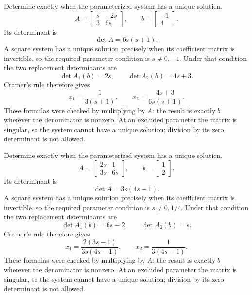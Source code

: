 \goal Determine exactly when the parameterized system has a unique solution.
\[A=\begin{bmatrix}s&- 2 s\\3&6 s\end{bmatrix},\qquad b=\begin{bmatrix}-1\\4\end{bmatrix}.\]
Its determinant is
\[\det A=6 s \left(s + 1\right).\]
A square system has a unique solution precisely when its coefficient matrix is invertible, so the required parameter condition is $s\ne0,-1$. Under that condition the two replacement determinants are
\[\det A_1(b)=2 s,\qquad\det A_2(b)=4 s + 3.\]
Cramer's rule therefore gives
\[x_1=\frac{1}{3 \left(s + 1\right)},\qquad x_2=\frac{4 s + 3}{6 s \left(s + 1\right)}.\]
These formulas were checked by multiplying by $A$: the result is exactly $b$ wherever the denominator is nonzero. At an excluded parameter the matrix is singular, so the system cannot have a unique solution; division by its zero determinant is not allowed.

\goal Determine exactly when the parameterized system has a unique solution.
\[A=\begin{bmatrix}2 s&1\\3 s&6 s\end{bmatrix},\qquad b=\begin{bmatrix}1\\2\end{bmatrix}.\]
Its determinant is
\[\det A=3 s \left(4 s - 1\right).\]
A square system has a unique solution precisely when its coefficient matrix is invertible, so the required parameter condition is $s\ne0,1/4$. Under that condition the two replacement determinants are
\[\det A_1(b)=6 s - 2,\qquad\det A_2(b)=s.\]
Cramer's rule therefore gives
\[x_1=\frac{2 \left(3 s - 1\right)}{3 s \left(4 s - 1\right)},\qquad x_2=\frac{1}{3 \left(4 s - 1\right)}.\]
These formulas were checked by multiplying by $A$: the result is exactly $b$ wherever the denominator is nonzero. At an excluded parameter the matrix is singular, so the system cannot have a unique solution; division by its zero determinant is not allowed.

